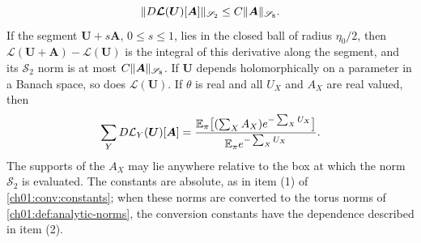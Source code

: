 \begin{theorem}
\begin{equation}\label{ch09:eq:supported-log-cauchy}
 \lVert D\boldsymbol{\mathcal L}(\boldsymbol U)[\boldsymbol A]\rVert_{\mathscr S_2}\le C\lVert \boldsymbol A\rVert_{\mathscr S_8}.
\end{equation}
If the segment $\boldsymbol U+s\boldsymbol A$, $0\le s\le1$, lies in the closed ball of radius $\eta_0/2$, then $\boldsymbol{\mathcal L}(\boldsymbol U+\boldsymbol A)-\boldsymbol{\mathcal L}(\boldsymbol U)$ is the integral of this derivative along the segment, and its $\mathscr S_2$ norm is at most $C\lVert \boldsymbol A\rVert_{\mathscr S_8}$. If $\boldsymbol U$ depends holomorphically on a parameter in a Banach space, so does $\boldsymbol{\mathcal L}(\boldsymbol U)$. If $\theta$ is real and all $U_X$ and $A_X$ are real valued, then
\[
 \sum_YD\mathcal L_Y(\boldsymbol U)[\boldsymbol A]=\frac{\mathbb E_\pi\bigl[(\sum_XA_X)e^{-\sum_XU_X}\bigr]}{\mathbb E_\pi e^{-\sum_XU_X}}.
\]
The supports of the $A_X$ may lie anywhere relative to the box at which the norm $\mathscr S_2$ is evaluated. The constants are absolute, as in item (1) of \cref{ch01:conv:constants}; when these norms are converted to the torus norms of \cref{ch01:def:analytic-norms}, the conversion constants have the dependence described in item (2).
\end{theorem}

